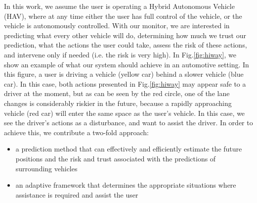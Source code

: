 \documentclass[letterpaper, 10 pt, conference]{ieeeconf}  %
\newcommand\NB[1]{$\spadesuit$\footnote{NB: #1}}
\begin{document}
In this work, we assume the user is operating a Hybrid Autonomous Vehicle (HAV), where at any time either the user has full control of the vehicle, or the vehicle is autonomously controlled. With our monitor, we are interested in predicting what every other vehicle will do, determining how much we trust our prediction, what the actions the user could take, assess the risk of these actions, and intervene only if needed (i.e. the risk is very high). 
In Fig.\ref{fig:hiway}, we show an example of what our system should achieve in an automotive setting. In this figure, a user is driving a vehicle (yellow car) behind a slower vehicle (blue car). In this case, both actions presented in Fig.\ref{fig:hiway} may appear safe to a driver at the moment, but as can be seen by the red circle, one of the lane changes is considerably riskier in the future, because a rapidly approaching vehicle (red car) will enter the same space as the user's vehicle. In this case, we see the driver's actions as a disturbance, and want to assist the driver. In order to achieve this, we contribute a two-fold approach:
    \begin{itemize}
    \item{a prediction method that can effectively and efficiently estimate the future positions and the risk and trust associated with the predictions of surrounding vehicles} %
    \item{an adaptive framework that determines the appropriate situations where assistance is required and assist the user} %
    \end{itemize}
    
\end{document}
